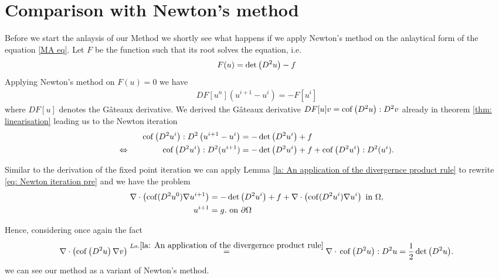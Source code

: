 \section{Comparison with Newton's method}

Before we start the anlaysis of our Method we shortly see what happens if we apply Newton's method on the anlaytical form of the \MA equation \ref{MA eq}.
Let $F$ be the function such that its root solves the \MA equation, i.e. 
\[
	F(u) = \det{\left(D^2 u\right)} -f
\]
Applying Newton's method on $F(u) =0$ we have
\begin{align}
	DF[u^n](u^{i+1}-u^i) = -F[u^i]
\end{align}
where $DF[u]$ denotes the G\^ateaux derivative. We derived the G\^ateaux derivative $DF[u] v = \operatorname{cof} \left( D^2 u \right):D^2v$ already in theorem \ref{thm: linearisation} leading us to the Newton iteration
\begin{align}
	\operatorname{cof} \left( D^2 u^i \right):D^2\left(u^{i+1}-u^i\right) &= -\det{\left(D^2 u^i\right)}+f \nonumber \\
	\Leftrightarrow \qquad \qquad  \operatorname{cof} \left( D^2 u^i \right):D^2(u^{i+1}) &= -\det{\left(D^2 u^i\right)} +f  +\operatorname{cof} \left( D^2 u^i \right):D^2(u^i). \label{eq: Newton iteration pre}
\end{align}

Similar to the derivation of the fixed point iteration we can apply Lemma \ref{la: An application of the divergernce product rule} to rewrite \eqref{eq: Newton iteration pre} and we have the problem
\begin{align}
	\nabla \cdot \left( \operatorname{cof}(D^2 u^0) \nabla u^{i+1} \right) &= -\det{\left(D^2u^i\right)} +f+\nabla \cdot \left( \operatorname{cof}(D^2 u^i) \nabla u^{i} \right)  \textnormal{ in } \Omega,  \label{eq: Newton iteration}\\
	u^{i+1} &= g. \textnormal{ on } \partial \Omega 
\end{align}

Hence, considering once again the fact 
\[
\nabla \cdot \left( \operatorname{cof} \left( D^2 u  \right) \nabla v \right)
\stackrel{La.\ref{la: An application of the divergernce product rule}}=\nabla \cdot {}\operatorname{cof} \left( D^2 u \right):D^2u
=\frac 1 2 \det{\left(D^2u\right)}.
\]
we can see our method as a variant of Newton's method. 

